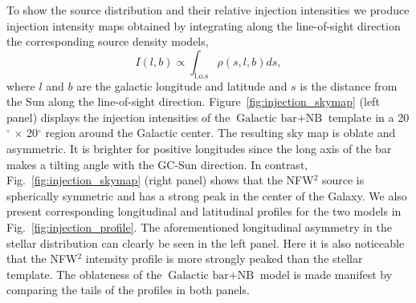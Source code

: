 \documentclass[doublespace,nopageskip]{VTthesis}
\begin{document}

To show the source distribution and their relative injection intensities we produce injection intensity maps obtained by integrating along the line-of-sight direction the corresponding source density models,
\begin{equation}
  \label{eq:j_factor}
  I(l,b) \propto \int_{\text{l.o.s}} \rho(s,l,b) ds,
\end{equation}
where $l$ and $b$ are the galactic longitude and latitude and $s$ is the distance from the Sun along the line-of-sight direction.
Figure~\ref{fig:injection_skymap} (left panel) displays the injection intensities of the $\mbox{Galactic bar}+\mbox{NB}$ template in a 20$^\circ$ $\times$ 20$^\circ$ region around the Galactic center. The resulting sky map is oblate and asymmetric. It is brighter for positive longitudes since the long axis of the bar makes a tilting angle with the GC-Sun direction. In contrast, Fig.~\ref{fig:injection_skymap} (right panel) shows that the NFW$^2$ source is spherically symmetric and has a strong peak in the center of the Galaxy. We also present corresponding longitudinal and latitudinal profiles for the two models in Fig.~\ref{fig:injection_profile}. The aforementioned longitudinal asymmetry in the stellar distribution can clearly be seen in the left panel. Here it is also noticeable that the NFW$^2$ intensity profile is more strongly peaked than the stellar template. The oblateness of the $\mbox{Galactic bar}+\mbox{NB}$ model is made manifest by comparing the tails of the profiles in both panels.
\end{document}
